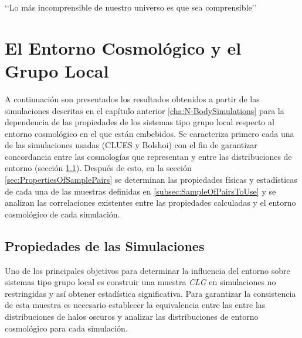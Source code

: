 \begin{savequote}[50mm]
‘‘Lo más incomprensible de nuestro universo es que sea comprensible’’
\end{savequote}




\chapter{El Entorno Cosmológico y el Grupo Local}
\label{cha:Results}


A continuación son presentados los resultados obtenidos a partir de las 
simulaciones descritas en el capítulo anterior \ref{cha:N-BodySimulations} 
para la dependencia de las propiedades de los sistemas tipo grupo 
local respecto al entorno cosmológico en el que están embebidos. Se 
caracteriza primero cada una de las simulaciones usadas (CLUES y Bolshoi) 
con el fin de garantizar concordancia entre las cosmologías que representan 
y entre las distribuciones de entorno (sección 
\ref{sec:StatisticalPropertiesOfAllSimulations}). Después de esto, en la
sección \ref{sec:PropertiesOfSamplePairs} se determinan las propiedades 
físicas y estadísticas de cada una de las muestras definidas en 
\ref{subsec:SampleOfPairsToUse} y se analizan las correlaciones 
existentes entre las propiedades calculadas y el entorno cosmológico de 
cada simulación.






\section{Propiedades de las Simulaciones}
\label{sec:StatisticalPropertiesOfAllSimulations}


Uno de los principales objetivos para determinar la influencia del entorno
sobre sistemas tipo grupo local es construir una muestra \textit{CLG} 
en simulaciones no res\-tringidas y así obtener estadística significativa. 
Para garantizar la consistencia de esta muestra es necesario
establecer la equivalencia entre las entre las distribuciones de halos 
oscuros y analizar las distribuciones de entorno cosmológico para cada 
simulación.


